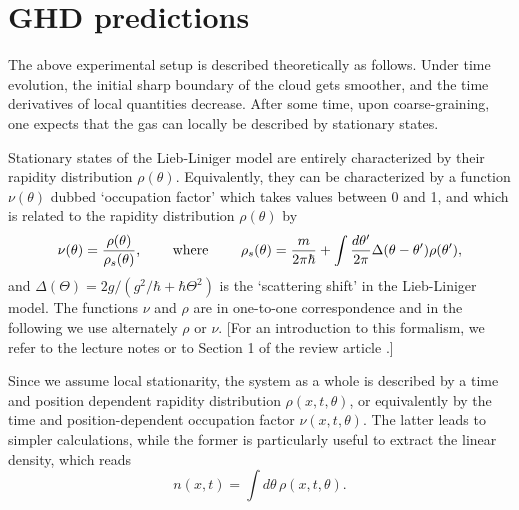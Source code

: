 \section{GHD predictions}\label{sec.GHDpredictions}
\label{sec:ghd}

The above experimental setup is described theoretically as follows. Under time evolution, the initial sharp boundary of the cloud gets smoother, and the time
derivatives of local quantities decrease. 
After some time, upon coarse-graining, one expects that the gas can locally be described by stationary states.

Stationary states of the Lieb-Liniger model are entirely characterized 
by their rapidity distribution $\rho(\theta)$.
Equivalently, they can be characterized by a function $\nu(\theta)$ dubbed `occupation factor' which takes values between 0 and 1, and which is related to  
the rapidity distribution $\rho(\theta)$ by
\begin{equation}
\nu(\theta)=\frac{\rho(\theta)}{\rho_s(\theta)} \mbox{, \qquad where \qquad } \rho_s(\theta)=
\frac{m}{2\pi \hbar} + \int \frac{d\theta'}{2\pi} \Delta(\theta-\theta') \rho(\theta') ,  \end{equation}
and $\Delta(\Theta)=2g/(g^2/\hbar+\hbar\Theta^2)$ is the `scattering shift' in the Lieb-Liniger model. The functions $\nu$ and $\rho$ are in one-to-one correspondence and in the following we use alternately $\rho$ or $\nu$. [For an introduction to this formalism, we refer to the lecture notes \cite{doyon2020lecture} or to Section 1 of the review article \cite{bouchoule_generalized_2022}.]

Since we assume local stationarity, the system as a whole is described by a time and position dependent rapidity distribution $\rho(x,t,\theta)$, or equivalently by the 
time and position-dependent occupation factor $\nu(x,t,\theta)$. The latter leads to simpler calculations, while the former is particularly useful to extract the linear density, which reads
\begin{equation}
    \label{eq:lineardensity}
n(x,t)=\int d\theta \, \rho(x,t,\theta)  .
\end{equation}


